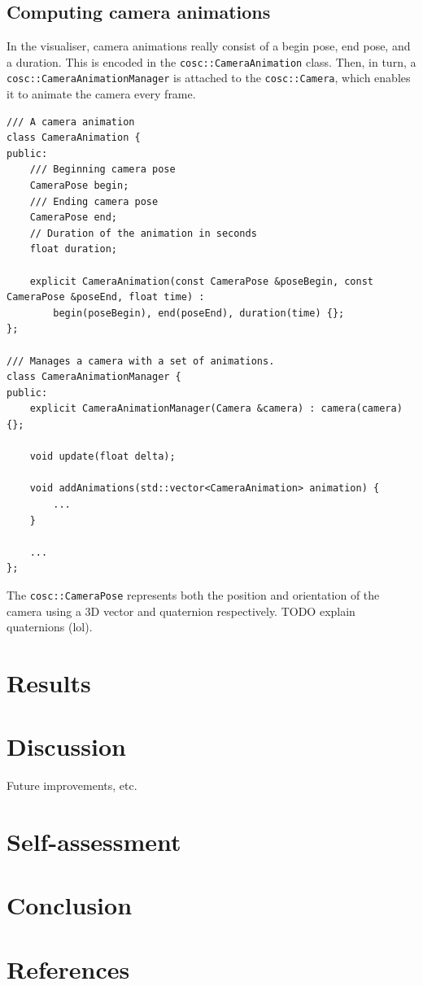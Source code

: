 \documentclass[11pt]{article}
\begin{document}
\subsection{Computing camera animations}
In the visualiser, camera animations really consist of a begin pose, end pose, and a duration. This is
encoded in the \verb|cosc::CameraAnimation| class. Then, in turn, a
\verb|cosc::CameraAnimationManager| is attached to the \verb|cosc::Camera|, which enables it to animate the
camera every frame.

\begin{verbatim}
/// A camera animation
class CameraAnimation {
public:
    /// Beginning camera pose
    CameraPose begin;
    /// Ending camera pose
    CameraPose end;
    // Duration of the animation in seconds
    float duration;

    explicit CameraAnimation(const CameraPose &poseBegin, const CameraPose &poseEnd, float time) :
        begin(poseBegin), end(poseEnd), duration(time) {};
};

/// Manages a camera with a set of animations.
class CameraAnimationManager {
public:
    explicit CameraAnimationManager(Camera &camera) : camera(camera) {};

    void update(float delta);

    void addAnimations(std::vector<CameraAnimation> animation) {
        ...
    }

    ...
};
\end{verbatim}

The \verb|cosc::CameraPose| represents both the position and orientation of the camera using a 3D vector and
quaternion respectively. TODO explain quaternions (lol).

\section{Results}

\section{Discussion}
Future improvements, etc.

\section{Self-assessment}

\section{Conclusion}

\section{References}
\printbibliography[heading=none]
\end{document}

